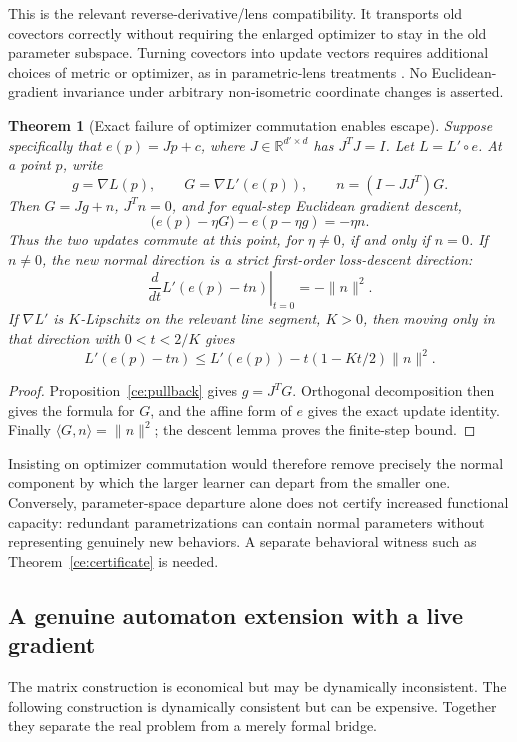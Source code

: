 \documentclass[11pt]{article}
\newtheorem{theorem}{Theorem}[section]
\theoremstyle{definition}
\theoremstyle{remark}
\begin{document}
This is the relevant reverse-derivative/lens compatibility. It transports
old covectors correctly without requiring the enlarged optimizer to stay in
the old parameter subspace. Turning covectors into update vectors requires
additional choices of metric or optimizer, as in parametric-lens treatments
\cite{ce:lenses2024}. No Euclidean-gradient invariance under arbitrary
non-isometric coordinate changes is asserted.

\begin{theorem}[Exact failure of optimizer commutation enables escape]
\label{ce:noncommutation}
Suppose specifically that $e(p)=Jp+c$, where
$J\in\mathbb R^{d'\times d}$ has $J^TJ=I$. Let $L=L'\circ e$.
At a point $p$, write
\[
 g=\nabla L(p),\qquad G=\nabla L'(e(p)),\qquad
 n=(I-JJ^T)G.
\]
Then $G=Jg+n$, $J^Tn=0$, and for equal-step Euclidean gradient descent,
\[
 \bigl(e(p)-\eta G\bigr)-e(p-\eta g)=-\eta n.
\]
Thus the two updates commute at this point, for $\eta\ne0$, if and only
if $n=0$. If $n\ne0$, the new normal direction is a strict first-order
loss-descent direction:
\[
 \left.\frac{d}{dt}L'(e(p)-tn)\right|_{t=0}=-\|n\|^2.
\]
If $\nabla L'$ is $K$-Lipschitz on the relevant line segment, $K>0$,
then moving only in that direction with $0<t<2/K$ gives
\[
 L'(e(p)-tn)\leq L'(e(p))
 -t(1-Kt/2)\|n\|^2.
\]
\end{theorem}
\begin{proof}
Proposition~\ref{ce:pullback} gives $g=J^TG$. Orthogonal decomposition
then gives the formula for $G$, and the affine form of $e$ gives the exact
update identity. Finally $\langle G,n\rangle=\|n\|^2$; the descent
lemma proves the finite-step bound.
\end{proof}

Insisting on optimizer commutation would therefore remove precisely the
normal component by which the larger learner can depart from the smaller
one. Conversely, parameter-space departure alone does not certify increased
functional capacity: redundant parametrizations can contain normal
parameters without representing genuinely new behaviors. A separate
behavioral witness such as Theorem~\ref{ce:certificate} is needed.

\subsection{A genuine automaton extension with a live gradient}

The matrix construction is economical but may be dynamically inconsistent.
The following construction is dynamically consistent but can be expensive.
Together they separate the real problem from a merely formal bridge.
\end{document}
